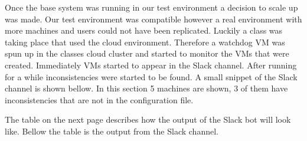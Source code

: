 \documentclass[12pt]{article}
\begin{document}
Once the base system was running in our test environment a decision to scale up was made. Our test environment was compatible however a real environment with more machines and users could not have been replicated. Luckily a class was taking place that used the cloud environment. Therefore a watchdog VM was spun up in the classes cloud cluster and started to monitor the VMs that were created. Immediately VMs started to appear in the Slack channel. After running for a while inconsistencies were started to be found. A small snippet of the Slack channel is shown bellow. In this section 5 machines are shown, 3 of them have inconsistencies that are not in the configuration file.

The table on the next page describes how the output of the Slack bot will look like. Bellow the table is the output from the Slack channel.

\begin{table}[htb]
\centering
\caption{Slack Ouput Breakdown}
\label{Slack Ouput Breakdown}
\end{table}

\newpage
\end{document}
